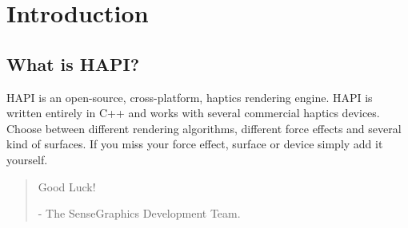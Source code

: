 
\chapter{Introduction}

\section{What is HAPI?}
HAPI is an open-source, cross-platform, haptics rendering engine. HAPI is
written entirely in C++ and works with several commercial haptics devices.
 Choose between different rendering algorithms, different force effects
 and several kind of surfaces. If you miss your force effect, surface or device
 simply add it yourself.

\begin{quotation}
Good Luck!

- The SenseGraphics Development Team.
\end{quotation}




 



